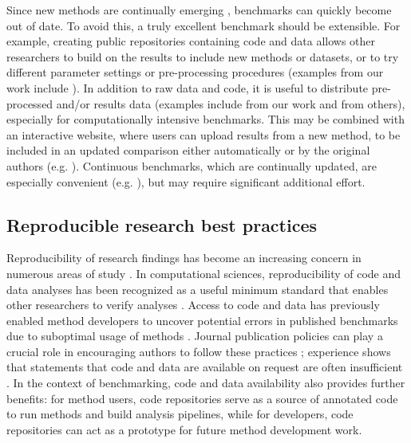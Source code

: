 Since new methods are continually emerging \cite{zappia_exploringsinglecellrnaseq_2018}, benchmarks can quickly become out of date. To avoid this, a truly excellent benchmark should be extensible. For example, creating public repositories containing code and data allows other researchers to build on the results to include new methods or datasets, or to try different parameter settings or pre-processing procedures (examples from our work include \cite{saelens_comparisonsinglecelltrajectory_2019,duo_systematicperformanceevaluation_2018,soneson_biasrobustnessscalability_2018,saelens_comprehensiveevaluationmodule_2018,weber_comparisonclusteringmethods_2016}). In addition to raw data and code, it is useful to distribute pre-processed and/or results data (examples include \cite{duo_systematicperformanceevaluation_2018,soneson_biasrobustnessscalability_2018,soneson_icobraopenreproducible_2016} from our work and \cite{wiwie_comparingperformancebiomedical_2015,bokulich_mockrobiotapublicresource_2016,conchuir_webresourcestandardized_2015} from others), especially for computationally intensive benchmarks. This may be combined with an interactive website, where users can upload results from a new method, to be included in an updated comparison either automatically or by the original authors (e.g. \cite{kanitz_comparativeassessmentmethods_2015,cope_benchmarkaffymetrixgenechip_2004,irizarry_comparisonaffymetrixgenechip_2006}). Continuous benchmarks, which are continually updated, are especially convenient (e.g. \cite{barton_nucleotidesgenomeassembler_2014}), but may require significant additional effort.

\subsection{Reproducible research best practices}

Reproducibility of research findings has become an increasing concern in numerous areas of study \cite{ioannidis_whymostpublished_2005}. In computational sciences, reproducibility of code and data analyses has been recognized as a useful minimum standard that enables other researchers to verify analyses \cite{peng_reproducibleresearchcomputational_2011}. Access to code and data has previously enabled method developers to uncover potential errors in published benchmarks due to suboptimal usage of methods \cite{vaquero-garcia_leafcuttervsmajiq_2018,zhou_countbaseddifferentialexpression_2015,zhou_mirnaseqnormalizationcomparisons_2013}. Journal publication policies can play a crucial role in encouraging authors to follow these practices \cite{hofner_reproducibleresearchstatistics_2016}; experience shows that statements that code and data are available on request are often insufficient \cite{boulesteix_makingcomplexprediction_2019}. In the context of benchmarking, code and data availability also provides further benefits: for method users, code repositories serve as a source of annotated code to run methods and build analysis pipelines, while for developers, code repositories can act as a prototype for future method development work.

